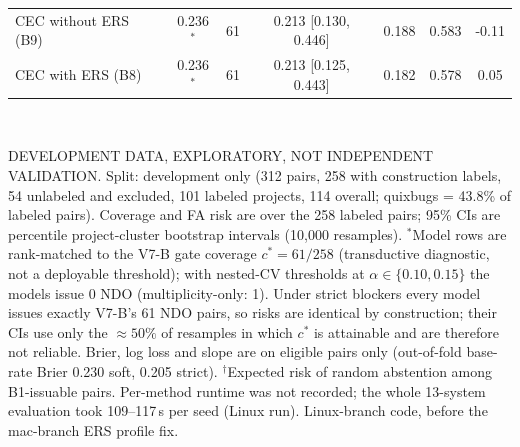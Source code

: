 \begin{table}[!t]
\begin{tabular}{|l|c|c|c|c|c|c|}
CEC without ERS (B9) & 0.236$^\ast$ & 61 & 0.213 [0.130, 0.446] & 0.188 & 0.583 & -0.11 \\
CEC with ERS (B8) & 0.236$^\ast$ & 61 & 0.213 [0.125, 0.443] & 0.182 & 0.578 & 0.05 \\
\hline
\end{tabular}
\\[2pt]
\parbox{\textwidth}{\scriptsize DEVELOPMENT DATA, EXPLORATORY, NOT INDEPENDENT VALIDATION. Split: development only (312 pairs, 258 with construction labels, 54 unlabeled and excluded, 101 labeled projects, 114 overall; quixbugs = 43.8\% of labeled pairs). Coverage and FA risk are over the 258 labeled pairs; 95\% CIs are percentile project-cluster bootstrap intervals (10{,}000 resamples). $^\ast$Model rows are rank-matched to the V7-B gate coverage $c^*=61/258$ (transductive diagnostic, not a deployable threshold); with nested-CV thresholds at $\alpha\in\{0.10,0.15\}$ the models issue 0 NDO (multiplicity-only: 1). Under strict blockers every model issues exactly V7-B's 61 NDO pairs, so risks are identical by construction; their CIs use only the ${\approx}50\%$ of resamples in which $c^*$ is attainable and are therefore not reliable. Brier, log loss and slope are on eligible pairs only (out-of-fold base-rate Brier 0.230 soft, 0.205 strict). $^\dagger$Expected risk of random abstention among B1-issuable pairs. Per-method runtime was not recorded; the whole 13-system evaluation took 109--117\,s per seed (Linux run). Linux-branch code, before the mac-branch ERS profile fix.}
\end{table}
